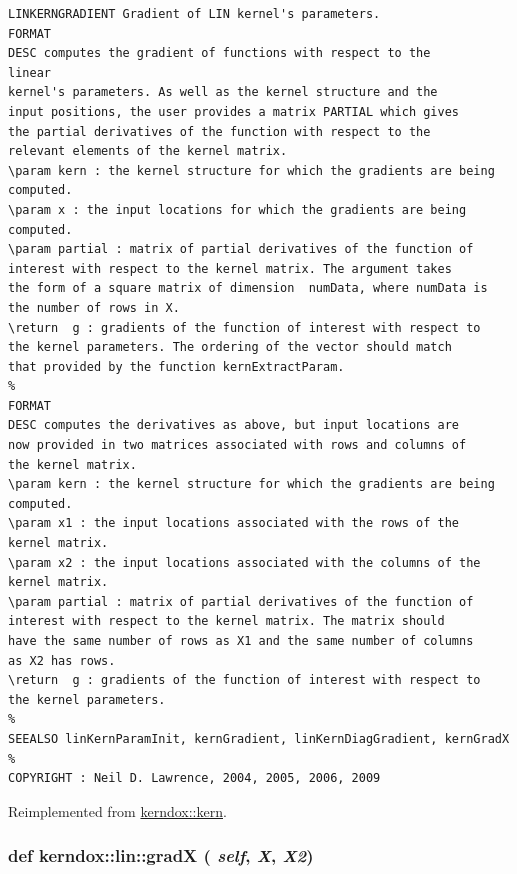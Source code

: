 \footnotesize\begin{verbatim}LINKERNGRADIENT Gradient of LIN kernel's parameters.
FORMAT
DESC computes the gradient of functions with respect to the
linear
kernel's parameters. As well as the kernel structure and the
input positions, the user provides a matrix PARTIAL which gives
the partial derivatives of the function with respect to the
relevant elements of the kernel matrix. 
\param kern : the kernel structure for which the gradients are being
computed.
\param x : the input locations for which the gradients are being
computed. 
\param partial : matrix of partial derivatives of the function of
interest with respect to the kernel matrix. The argument takes
the form of a square matrix of dimension  numData, where numData is
the number of rows in X.
\return  g : gradients of the function of interest with respect to
the kernel parameters. The ordering of the vector should match
that provided by the function kernExtractParam.
%
FORMAT
DESC computes the derivatives as above, but input locations are
now provided in two matrices associated with rows and columns of
the kernel matrix. 
\param kern : the kernel structure for which the gradients are being
computed.
\param x1 : the input locations associated with the rows of the
kernel matrix.
\param x2 : the input locations associated with the columns of the
kernel matrix.
\param partial : matrix of partial derivatives of the function of
interest with respect to the kernel matrix. The matrix should
have the same number of rows as X1 and the same number of columns
as X2 has rows.
\return  g : gradients of the function of interest with respect to
the kernel parameters.
%
SEEALSO linKernParamInit, kernGradient, linKernDiagGradient, kernGradX
%
COPYRIGHT : Neil D. Lawrence, 2004, 2005, 2006, 2009

\end{verbatim}
\normalsize
 

Reimplemented from \hyperlink{classkerndox_1_1kern}{kerndox::kern}.\hypertarget{classkerndox_1_1lin_6841d17e0033af3149d4627acc81fbfd}{
\subsubsection[{gradX}]{\setlength{\rightskip}{0pt plus 5cm}def kerndox::lin::gradX ( {\em self}, \/   {\em X}, \/   {\em X2})}}
\label{classkerndox_1_1lin_6841d17e0033af3149d4627acc81fbfd}




